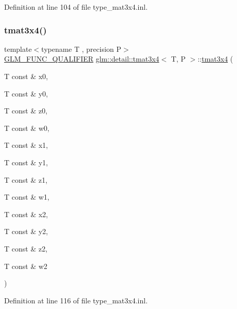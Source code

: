 Definition at line 104 of file type\+\_\+mat3x4.\+inl.

\mbox{\label{structglm_1_1detail_1_1tmat3x4_a81b6dd1cfa5b7835f6ae42fbd1565c37}} 
\subsubsection{\texorpdfstring{tmat3x4()}{tmat3x4()}\hspace{0.1cm}{\footnotesize\ttfamily [6/22]}}
{\footnotesize\ttfamily template$<$typename T , precision P$>$ \\
\hyperlink{setup_8hpp_a33fdea6f91c5f834105f7415e2a64407}{G\+L\+M\+\_\+\+F\+U\+N\+C\+\_\+\+Q\+U\+A\+L\+I\+F\+I\+ER} \hyperlink{structglm_1_1detail_1_1tmat3x4}{glm\+::detail\+::tmat3x4}$<$ T, P $>$\+::\hyperlink{structglm_1_1detail_1_1tmat3x4}{tmat3x4} (\begin{DoxyParamCaption}\item[{T const \&}]{x0,  }\item[{T const \&}]{y0,  }\item[{T const \&}]{z0,  }\item[{T const \&}]{w0,  }\item[{T const \&}]{x1,  }\item[{T const \&}]{y1,  }\item[{T const \&}]{z1,  }\item[{T const \&}]{w1,  }\item[{T const \&}]{x2,  }\item[{T const \&}]{y2,  }\item[{T const \&}]{z2,  }\item[{T const \&}]{w2 }\end{DoxyParamCaption})}



Definition at line 116 of file type\+\_\+mat3x4.\+inl.

\mbox{\label{structglm_1_1detail_1_1tmat3x4_a6cab10dc73539c161f81089f4e49944b}} 

